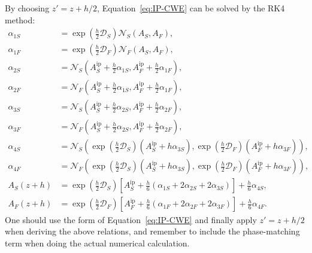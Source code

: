 \documentclass[a4paper,10pt]{ctexart}
\begin{document}
By choosing $z'=z+h/2$, Equation~\eqref{eq:IP-CWE} can be solved by the RK4
method:
\begin{align}
  \alpha_{1S} & =\exp\left(\frac{h}{2}\mathcal{D}_S\right)
  \mathcal{N}_S(A_S,A_F),                                                     \\
  \alpha_{1F} & =\exp\left(\frac{h}{2}\mathcal{D}_F\right)
  \mathcal{N}_F(A_S,A_F),                                                     \\
  \alpha_{2S} & =\mathcal{N}_S\left(A_S^{\mathrm{ip}}+\frac{h}{2}\alpha_{1S},
  A_F^{\mathrm{ip}}+\frac{h}{2}\alpha_{1F}\right),                            \\
  \alpha_{2F} & =\mathcal{N}_F\left(A_S^{\mathrm{ip}}+\frac{h}{2}\alpha_{1S},
  A_F^{\mathrm{ip}}+\frac{h}{2}\alpha_{1F}\right),                            \\
  \alpha_{3S} & =\mathcal{N}_S\left(A_S^{\mathrm{ip}}+\frac{h}{2}\alpha_{2S},
  A_F^{\mathrm{ip}}+\frac{h}{2}\alpha_{2F}\right),                            \\
  \alpha_{3F} & =\mathcal{N}_F\left(A_S^{\mathrm{ip}}+\frac{h}{2}\alpha_{2S},
  A_F^{\mathrm{ip}}+\frac{h}{2}\alpha_{2F}\right),                            \\
  \alpha_{4S} & =\mathcal{N}_S\left(
  \exp\left(\frac{h}{2}\mathcal{D}_S\right)
  (A_S^{\mathrm{ip}}+h\alpha_{3S}),
  \exp\left(\frac{h}{2}\mathcal{D}_F\right)
  (A_F^{\mathrm{ip}}+h\alpha_{3F})\right),                                    \\
  \alpha_{4F} & =\mathcal{N}_F\left(
  \exp\left(\frac{h}{2}\mathcal{D}_S\right)
  (A_S^{\mathrm{ip}}+h\alpha_{3S}),
  \exp\left(\frac{h}{2}\mathcal{D}_F\right)
  (A_F^{\mathrm{ip}}+h\alpha_{3F})\right),                                    \\
  A_S(z+h)    & =\exp\left(\frac{h}{2}\mathcal{D}_S\right)
  \left[A_S^{\mathrm{ip}}+\frac{h}{6}
    (\alpha_{1S}+2\alpha_{2S}+2\alpha_{3S})\right]
  +\frac{h}{6}\alpha_{4S},                                                    \\
  A_F(z+h)    & =\exp\left(\frac{h}{2}\mathcal{D}_F\right)
  \left[A_F^{\mathrm{ip}}+\frac{h}{6}
    (\alpha_{1F}+2\alpha_{2F}+2\alpha_{3F})\right]
  +\frac{h}{6}\alpha_{4F}.
\end{align}
One should use the form of Equation~\eqref{eq:IP-CWE} and finally apply
$z'=z+h/2$ when deriving the above relations, and remember to include the
phase-matching term when doing the actual numerical calculation.

\printbibliography
\end{document}
